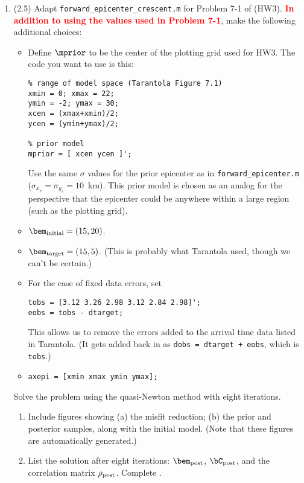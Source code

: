\documentclass[11pt,titlepage,fleqn]{article}
\begin{document}
\begin{enumerate}

\item (2.5) Adapt \verb+forward_epicenter_crescent.m+ for Problem 7-1 of \citet{Tarantola2005} (HW3). \textcolor{red}{\bf In addition to using the values used in Problem 7-1}, make the following additional choices:
%
\begin{itemize}
\item Define $\mprior$ to be the center of the plotting grid used for HW3. The code you want to use is this:
%
\begin{verbatim}
% range of model space (Tarantola Figure 7.1)
xmin = 0; xmax = 22;
ymin = -2; ymax = 30;
xcen = (xmax+xmin)/2;
ycen = (ymin+ymax)/2;

% prior model
mprior = [ xcen ycen ]';
\end{verbatim}
%
Use the same $\sigma$ values for the prior epicenter as in \verb+forward_epicenter.m+ ($\sigma_{x_s} = \sigma_{y_s} = 10$~km). This prior model is chosen as an analog for the perspective that the epicenter could be anywhere within a large region (such as the plotting grid).

\item $\bem_{\rm initial} = (15, 20)$.

\item $\bem_{\rm target} = (15, 5)$. (This is probably what Tarantola used, though we can't be certain.)

\item For the case of fixed data errors, set
%
\begin{verbatim}
tobs = [3.12 3.26 2.98 3.12 2.84 2.98]';
eobs = tobs - dtarget;
\end{verbatim}
%
This allows us to remove the errors added to the arrival time data listed in Tarantola. (It gets added back in as {\tt dobs = dtarget + eobs}, which is \verb+tobs+.)

\item \verb+axepi = [xmin xmax ymin ymax];+

\end{itemize}

Solve the problem using the quasi-Newton method with eight iterations.
%
\begin{enumerate}
\item Include figures showing (a) the misfit reduction; (b) the prior and posterior samples, along with the initial model. (Note that these figures are automatically generated.)

\item List the solution after eight iterations: $\bem_{\rm post}$, $\bC_{\rm post}$, and the correlation matrix $\rho_{\rm post}$. Complete . 


\end{enumerate}
\end{enumerate}
\end{document}
